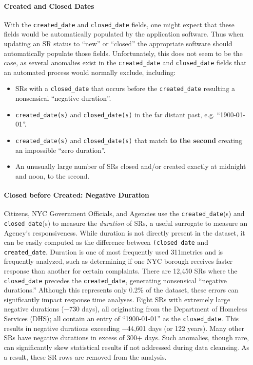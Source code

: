 \documentclass[linenumber]{jdsart}
\begin{document}
\paragraph{Created and Closed Dates}
\label{sec:negativeduration}
With the \texttt{created\_date} and \texttt{closed\_date} fields, one 
might expect that these fields would be automatically populated by the  
application software. Thus when updating an SR status to ``new'' or ``closed''
the appropriate software should automatically populate those fields. 
Unfortunately, this does not seem to be the case, as several anomalies 
exist in the \texttt{created\_date} and \texttt{closed\_date} fields that
an automated process would normally exclude, including:

\begin{itemize}[left=1.5em]
    \item SRs with a \texttt{closed\_date} that occurs before the 
    \texttt{created\_date} resulting a nonsensical ``negative duration''.
    \item \texttt{created\_date(s)} and \texttt{closed\_date(s)} in 
    the far distant past, e.g. ``1900-01-01''.
    \item \texttt{created\_date(s)} and \texttt{closed\_date(s)} that 
    match \textbf{to the second} creating an impossible ``zero duration''.
    \item An unusually large number of SRs closed and/or created exactly at midnight 
    and noon, to the second.
\end{itemize}


\paragraph{Closed before Created: Negative Duration}
Citizens, NYC Government Officials, and Agencies use the \texttt{created\_date}(s) and 
\texttt{closed\_date}(s) to measure the \textit{duration} of SRs, 
a useful surrogate to measure an Agency's responsiveness. 
While duration is not directly present in the dataset, 
it can be easily computed as the difference between
\texttt{(closed\_date} and \texttt{created\_date}.  Duration is one of 
most frequently used 311metrics and is frequently analyzed, such as determining if 
one NYC borough receives faster response than another for certain 
complaints. There are 12,450 SRs where the \texttt{closed\_date} precedes the 
\texttt{created\_date}, generating nonsensical ``negative durations.'' 
Although this represents only 0.2\% of the dataset, these errors can 
significantly impact response time analyses. Eight SRs with extremely 
large negative durations ($-$730 days), all originating from the 
Department of Homeless Services (DHS); all contain an entry 
of ``1900-01-01'' as the \texttt{closed\_date}. This results 
in negative durations exceeding $-$44,601 days (or 122 years). Many
other SRs have negative durations in excess of 300+ days. Such 
anomalies, though rare, can significantly skew statistical results if 
not addressed during data cleansing. As a result, these SR rows are 
removed from the analysis. 
\end{document}
